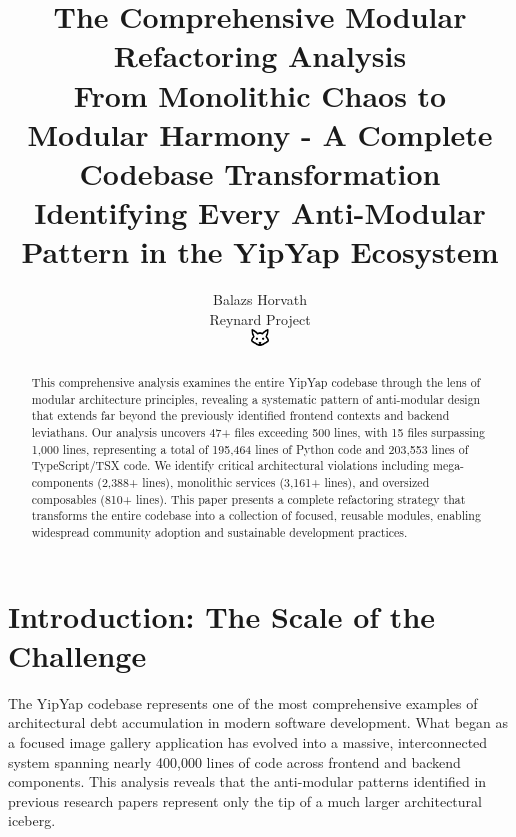 \documentclass[11pt]{article}
\begin{document}
\title{\textbf{The Comprehensive Modular Refactoring Analysis} \\
\Large{From Monolithic Chaos to Modular Harmony - A Complete Codebase Transformation} \\
\large{Identifying Every Anti-Modular Pattern in the YipYap Ecosystem}}

\author{Balazs Horvath\\
Reynard Project\\
\includegraphics[width=0.5cm]{../../shared-assets/favicon.pdf}}

\maketitle

\begin{abstract}
This comprehensive analysis examines the entire YipYap codebase through the lens of modular architecture principles, revealing a systematic pattern of anti-modular design that extends far beyond the previously identified frontend contexts and backend leviathans. Our analysis uncovers 47+ files exceeding 500 lines, with 15 files surpassing 1,000 lines, representing a total of 195,464 lines of Python code and 203,553 lines of TypeScript/TSX code. We identify critical architectural violations including mega-components (2,388+ lines), monolithic services (3,161+ lines), and oversized composables (810+ lines). This paper presents a complete refactoring strategy that transforms the entire codebase into a collection of focused, reusable modules, enabling widespread community adoption and sustainable development practices.
\end{abstract}

\tableofcontents
\newpage

\section{Introduction: The Scale of the Challenge}

The YipYap codebase represents one of the most comprehensive examples of architectural debt accumulation in modern software development. What began as a focused image gallery application has evolved into a massive, interconnected system spanning nearly 400,000 lines of code across frontend and backend components. This analysis reveals that the anti-modular patterns identified in previous research papers represent only the tip of a much larger architectural iceberg.
\end{document}
